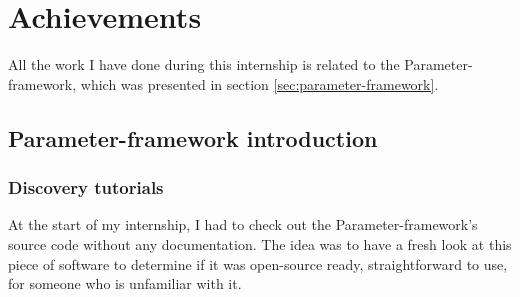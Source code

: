 \chapter{Achievements}

\begin{sectionIntro}
    All the work I have done during this internship is related
    to the Parameter-framework, which was presented in section \ref{sec:parameter-framework}.
\end{sectionIntro}

%
%
%

\section{Parameter-framework introduction}
\subsection{Discovery tutorials}

At the start of my internship, I had to check out the Parameter-framework's
source code without any documentation. The idea was to have a fresh look at
this piece of software to determine if it was open-source ready, straightforward
to use, for someone who is unfamiliar with it.

